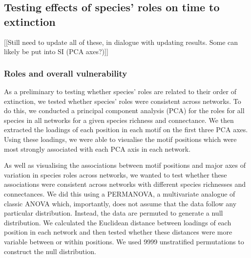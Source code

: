 \documentclass[12pt]{article}
\begin{document}
	\subsection*{Testing effects of species' roles on time to extinction} [[Still need to update all of these, in dialogue with updating results. Some can likely be put into SI (PCA axes?)]]

		\subsubsection*{Roles and overall vulnerability}

			As a preliminary to testing whether species' roles are related to their order of extinction, we tested whether species' roles were consistent across networks. To do this, we conducted a principal component analysis (PCA) for the roles for all species in all networks for a given species richness and connectance. We then extracted the loadings of each position in each motif on the first three PCA axes. Using these loadings, we were able to visualise the motif positions which were most strongly associated with each PCA axis in each network.


			As well as visualising the associations between motif positions and major axes of variation in species roles across networks, we wanted to test whether these associations were consistent across networks with different species richnesses and connectances. We did this using a PERMANOVA, a multivariate analogue of classic ANOVA which, importantly, does not assume that the data follow any particular distribution. Instead, the data are permuted to generate a null distribution. We calculated the Euclidean distance between loadings of each position in each network and then tested whether these distances were more variable between or within positions.  We used 9999 unstratified permutations to construct the null distribution. 


\end{document}
